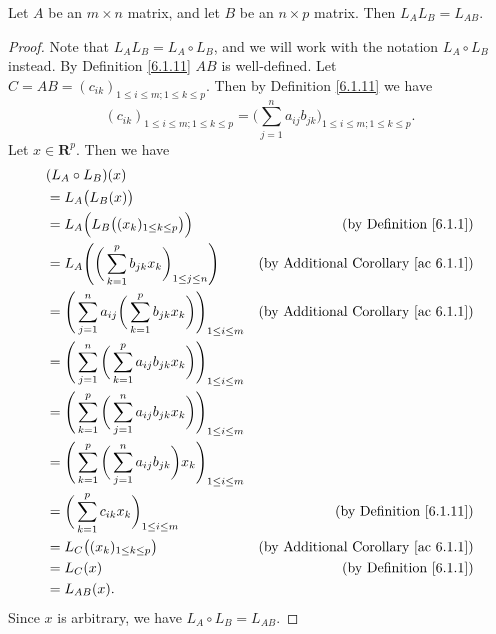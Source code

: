 \begin{lemma}\label{6.1.16}
    Let \(A\) be an \(m \times n\) matrix, and let \(B\) be an \(n \times p\) matrix.
    Then \(L_A L_B = L_{AB}\).
\end{lemma}

\begin{proof}
    Note that \(L_A L_B = L_A \circ L_B\), and we will work with the notation \(L_A \circ L_B\) instead.
    By Definition \ref{6.1.11} \(AB\) is well-defined.
    Let \(C = AB = (c_{ik})_{1 \leq i \leq m ; 1 \leq k \leq p}\).
    Then by Definition \ref{6.1.11} we have
    \[
        (c_{ik})_{1 \leq i \leq m ; 1 \leq k \leq p} = \bigg(\sum_{j = 1}^n a_{ij} b_{jk}\bigg)_{1 \leq i \leq m ; 1 \leq k \leq p}.
    \]
    Let \(x \in \mathbf{R}^p\).
    Then we have
    \begin{align*}
         & (L_A \circ L_B)(x)                                                                                                                            \\
         & = L_A\big(L_B(x)\big)                                                                                                                         \\
         & = L_A\Big(L_B\big((x_k)_{1 \leq k \leq p}\big)\Big)                                         & \text{(by Definition \ref{6.1.1})}              \\
         & = L_A\Bigg(\bigg(\sum_{k = 1}^p b_{jk} x_k\bigg)_{1 \leq j \leq n}\Bigg)                    & \text{(by Additional Corollary \ref{ac 6.1.1})} \\
         & = \Bigg(\sum_{j = 1}^n a_{ij} \bigg(\sum_{k = 1}^p b_{jk} x_k\bigg)\Bigg)_{1 \leq i \leq m} & \text{(by Additional Corollary \ref{ac 6.1.1})} \\
         & = \Bigg(\sum_{j = 1}^n \bigg(\sum_{k = 1}^p a_{ij} b_{jk} x_k\bigg)\Bigg)_{1 \leq i \leq m}                                                   \\
         & = \Bigg(\sum_{k = 1}^p \bigg(\sum_{j = 1}^n a_{ij} b_{jk} x_k\bigg)\Bigg)_{1 \leq i \leq m}                                                   \\
         & = \Bigg(\sum_{k = 1}^p \bigg(\sum_{j = 1}^n a_{ij} b_{jk}\bigg) x_k\Bigg)_{1 \leq i \leq m}                                                   \\
         & = \bigg(\sum_{k = 1}^p c_{ik} x_k\bigg)_{1 \leq i \leq m}                                   & \text{(by Definition \ref{6.1.11})}             \\
         & = L_C\big((x_k)_{1 \leq k \leq p}\big)                                                      & \text{(by Additional Corollary \ref{ac 6.1.1})} \\
         & = L_C(x)                                                                                    & \text{(by Definition \ref{6.1.1})}              \\
         & = L_{AB}(x).
    \end{align*}
    Since \(x\) is arbitrary, we have \(L_A \circ L_B = L_{AB}\).
\end{proof}

